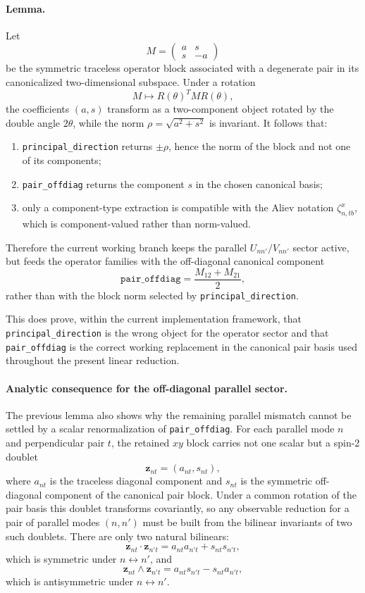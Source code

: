 \documentclass[11pt]{article}
\begin{document}
\paragraph{Lemma.}
Let
\[
M=
\begin{pmatrix}
a & s\\
s & -a
\end{pmatrix}
\]
be the symmetric traceless operator block associated with a degenerate pair in
its canonicalized two-dimensional subspace. Under a rotation
\[
M\mapsto R(\theta)^TMR(\theta),
\]
the coefficients $(a,s)$ transform as a two-component object rotated by the
double angle $2\theta$, while the norm $\rho=\sqrt{a^2+s^2}$ is invariant. It
follows that:
\begin{enumerate}
\item \texttt{principal\_direction} returns $\pm \rho$, hence the norm of the
block and not one of its components;
\item \texttt{pair\_offdiag} returns the component $s$ in the chosen canonical
basis;
\item only a component-type extraction is compatible with the Aliev notation
$\zeta^x_{n,tb}$, which is component-valued rather than norm-valued.
\end{enumerate}

Therefore the current working branch keeps the parallel $U_{nn'}/V_{nn'}$
sector active, but feeds the operator families with the off-diagonal canonical
component
\[
\texttt{pair\_offdiag}=\frac{M_{12}+M_{21}}{2},
\]
rather than with the block norm selected by
\texttt{principal\_direction}.

This does prove, within the current implementation framework, that
\texttt{principal\_direction} is the wrong object for the operator sector and
that \texttt{pair\_offdiag} is the correct working replacement in the canonical
pair basis used throughout the present linear reduction.

\paragraph{Analytic consequence for the off-diagonal parallel sector.}
The previous lemma also shows why the remaining parallel mismatch cannot be
settled by a scalar renormalization of \texttt{pair\_offdiag}. For each
parallel mode $n$ and perpendicular pair $t$, the retained $xy$ block carries
not one scalar but a spin-2 doublet
\[
\mathbf z_{nt}=(a_{nt},s_{nt}),
\]
where $a_{nt}$ is the traceless diagonal component and $s_{nt}$ is the
symmetric off-diagonal component of the canonical pair block. Under a common
rotation of the pair basis this doublet transforms covariantly, so any
observable reduction for a pair of parallel modes $(n,n')$ must be built from
the bilinear invariants of two such doublets. There are only two natural
bilinears:
\[
\mathbf z_{nt}\!\cdot\!\mathbf z_{n't}=a_{nt}a_{n't}+s_{nt}s_{n't},
\]
which is symmetric under $n\leftrightarrow n'$, and
\[
\mathbf z_{nt}\wedge\mathbf z_{n't}=a_{nt}s_{n't}-s_{nt}a_{n't},
\]
which is antisymmetric under $n\leftrightarrow n'$.
\end{document}
